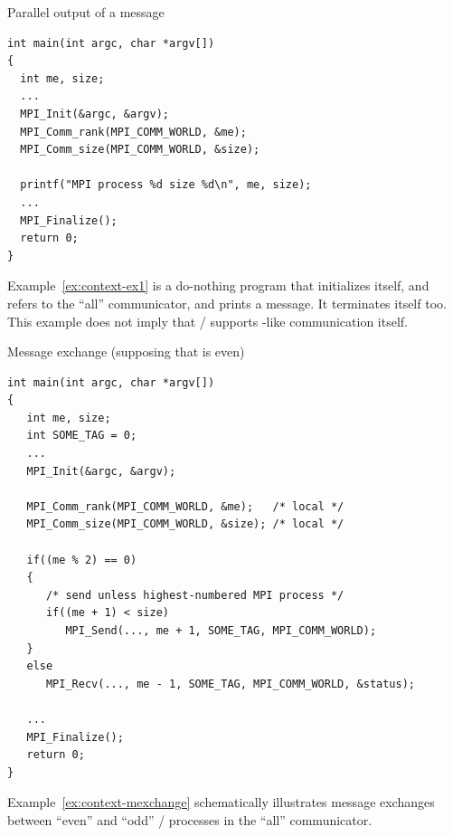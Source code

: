 \begin{example}
\label{ex:context-ex1}
\noindent Parallel output of a message
\begin{lstlisting}[language={[MPI]C}]
int main(int argc, char *argv[])
{
  int me, size;
  ...
  MPI_Init(&argc, &argv);
  MPI_Comm_rank(MPI_COMM_WORLD, &me);
  MPI_Comm_size(MPI_COMM_WORLD, &size);

  printf("MPI process %d size %d\n", me, size);
  ...
  MPI_Finalize();
  return 0;
}
\end{lstlisting}
Example~\ref{ex:context-ex1} is a do-nothing program that initializes itself,
and refers to the ``all'' communicator, and prints a message. It
terminates itself too. This example does not imply that \MPI/
supports -like communication itself.
\end{example}

\begin{example}
\noindent Message exchange (supposing that  is even)
\label{ex:context-mexchange}
\begin{lstlisting}[language={[MPI]C}]
int main(int argc, char *argv[])
{
   int me, size;
   int SOME_TAG = 0;
   ...
   MPI_Init(&argc, &argv);

   MPI_Comm_rank(MPI_COMM_WORLD, &me);   /* local */
   MPI_Comm_size(MPI_COMM_WORLD, &size); /* local */

   if((me % 2) == 0)
   {
      /* send unless highest-numbered MPI process */
      if((me + 1) < size)
         MPI_Send(..., me + 1, SOME_TAG, MPI_COMM_WORLD);
   }
   else
      MPI_Recv(..., me - 1, SOME_TAG, MPI_COMM_WORLD, &status);

   ...
   MPI_Finalize();
   return 0;
}
\end{lstlisting}
Example~\ref{ex:context-mexchange} schematically illustrates
message exchanges between ``even'' and ``odd'' \MPI/ processes in the ``all''
communicator.
\end{example}

